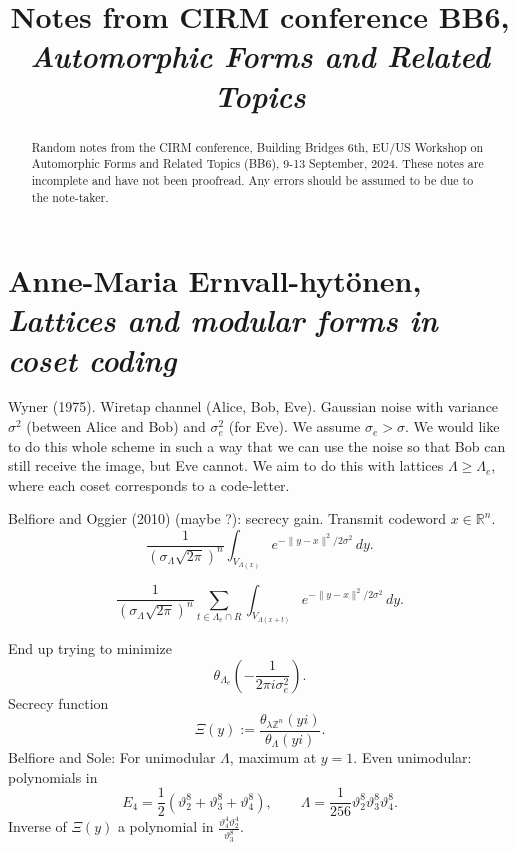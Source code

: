 \documentclass[reqno]{amsart} 
\begin{document}
\title{Notes from CIRM conference BB6, \emph{Automorphic Forms and Related Topics}}

\begin{abstract}
  Random notes from the CIRM conference, Building Bridges 6th, EU/US Workshop on Automorphic Forms and Related Topics (BB6),
  9-13 September, 2024.  These notes are incomplete and have not been proofread.  Any errors should be assumed to be due to the note-taker.
\end{abstract}


\section{Anne-Maria Ernvall-hytönen, \textnormal{\emph{Lattices and modular forms in coset coding}}}

Wyner (1975).  Wiretap channel (Alice, Bob, Eve).  Gaussian noise with variance $\sigma^2$ (between Alice and Bob) and $\sigma_e^2$ (for Eve).  We assume $\sigma_e > \sigma$.  We would like to do this whole scheme in such a way that we can use the noise so that Bob can still receive the image, but Eve cannot.  We aim to do this with lattices $\Lambda \geq \Lambda_e$, where each coset corresponds to a code-letter.

Belfiore and Oggier (2010) (maybe \cite{MR4032962}?): secrecy gain.  Transmit codeword $x \in \mathbb{R}^n$.
\begin{equation*}
  \frac{1}{(\sigma_\Lambda \sqrt{2 \pi})^n}
  \int_{V_{\Lambda(x)}}
  e^{- \lVert y - x \rVert^2 / 2 \sigma^2} \, d y.
\end{equation*}

\begin{equation*}
  \frac{1}{(\sigma_\Lambda \sqrt{2 \pi})^n}
  \sum_{t \in \Lambda_e \cap R}
  \int_{V_{\Lambda(x + t)}}
  e^{- \lVert y - x \rVert^2 / 2 \sigma^2} \, d y.
\end{equation*}

End up trying to minimize
\begin{equation*}
  \theta_{\Lambda_e} \left( - \frac{1}{2 \pi i \sigma_e^2} \right).
\end{equation*}
Secrecy function
\begin{equation*}
  \Xi(y) :=
  \frac{\theta_{\lambda \mathbb{Z}^n}(y i)}{ \theta_\Lambda(y i)}.
\end{equation*}
Belfiore and Sole: For unimodular $\Lambda$, maximum at $y = 1$.  Even unimodular: polynomials in
\begin{equation*}
  E_4 = \frac{1}{2} \left( \vartheta_2^8 + \vartheta_3^8 + \vartheta_4^8  \right),
  \qquad
  \Lambda = \frac{1}{256} \vartheta_2^8 \vartheta_3^8 \vartheta_4^8.
\end{equation*}
Inverse of $\Xi(y)$ a polynomial in $\frac{\vartheta_4^4 \vartheta_2^4}{\vartheta_3^8}$.
\end{document}
